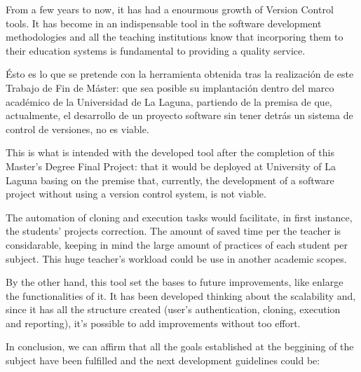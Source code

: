 

From a few years to now, it has had a enourmous growth of Version Control tools. It has become in an indispensable tool in the software development methodologies and all the teaching institutions know that incorporing them to their education systems is fundamental to providing a quality service.
\bigskip

Ésto es lo que se pretende con la herramienta obtenida tras la realización de este Trabajo de Fin de Máster: que sea posible su implantación dentro del marco académico de la Universidad de La Laguna, partiendo de la premisa de que, actualmente, el desarrollo de un proyecto software sin tener detrás un sistema de control de versiones, no es viable.
\bigskip

This is what is intended with the developed tool after the completion of this Master's Degree Final Project: that it would be deployed at University of La Laguna basing on the premise that, currently, the development of a software project without using a version control system, is not viable. 
\bigskip

The automation of cloning and execution tasks would facilitate, in first instance, the students' projects correction. The amount of saved time per the teacher is considarable, keeping in mind the large amount of practices of each student per subject. This huge teacher's workload could be use in another academic scopes.
\bigskip

By the other hand, this tool set the bases to future improvements, like enlarge the functionalities of it. It has been developed thinking about the scalability and, since it has all the structure created (user's authentication, cloning, execution and reporting), it's possible to add improvements without too effort.
\newpage

In conclusion, we can affirm that all the goals established at the beggining of the subject have been fulfilled and the next development guidelines could be:


